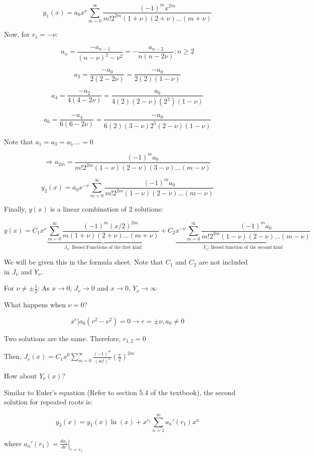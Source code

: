 \documentclass{article}
\begin{document}
$$y_1(x) = a_0 x^{\nu} \sum_{m = 0}^\infty \frac{(-1)^m x^{2m}}{m! 2^{2m} (1 + \nu)(2 + \nu) ... (m + \nu)}$$

Now, for $r_1 = - \nu$:

$$a_n = \frac{-a_{n-1}}{(n - \nu)^2 - \nu^2} = -\frac{a_{n-2}}{n(n - 2 \nu)}; n \geq 2$$

$$a_2 = \frac{-a_0}{2(2-2\nu)} = \frac{-a_0}{2(2)(1-\nu)}$$

$$a_4 = \frac{-a_2}{4(4-2\nu)} = \frac{a_0}{4(2)(2-\nu)(2^2)(1 - \nu)}$$

$$a_6 = \frac{-a_4}{6(6 - 2 \nu)} = \frac{-a_0}{6(2)(3-\nu)2^5 (2 - \nu) (1 - \nu)}$$

Note that $a_1 = a_3 = a_5 .... = 0$

$$\Rightarrow a_{2m} = \frac{(-1)^m a_0}{m! 2^{2m} (1-\nu)(2 - \nu) (3 - \nu) ... (m - \nu)}$$

$$ y_2(x) = a_0 x^{-\nu} \sum_{m = 0}^\infty \frac{(-1)^m a_0}{m! 2^{2m} (1-\nu)(2 - \nu) ... (m - \nu)}$$

Finally, $y(x)$ is a linear combination of 2 solutions:

$$y(x) = C_1 x^{\nu} \underbrace{\sum_{m = 0}^\infty \frac{(-1)^m (x/2)^{2m}}{m (1 + \nu)(2 + \nu) ... (m + \nu)}}_{J_\nu \text{: Bessel Functions of the first kind}} + C_2 \underbrace{x^{-\nu} \sum_{m = 0}^\infty \frac{(-1)^m a_0}{m! 2^{2m} (1-\nu)(2 - \nu) ... (m - \nu)}}_{Y_\nu \text{: Bessel function of the second kind}}$$

We will be given this in the formula sheet. Note that $C_1$ and $C_2$ are not included in $J_\nu$ and $Y_\nu$.

For $\nu \neq \pm \frac{1}{2}$: As $x \to  0$, $J_\nu \to 0$ and $x \to  0$, $Y_\nu \to \infty$

What happens when $\nu = 0$?

$$x^r | a_0 (r^2 - \nu^2) = 0 \rightarrow r = \pm \nu, a_0 \neq 0$$

Two solutions are the same. Therefore, $r_{1,2} = 0$


Then, $J_\nu(x) = C_1 x^0 \sum_{m = 0}^\infty \frac{(-1)^m}{(m!)^2} \left(\frac{x}{2} \right)^{2m}$

How about $Y_\nu (x)$?

Similar to Euler's equation (Refer to section 5.4 of the textbook), the second solution for repeated roots is:

$$y_2 (x) = y_1(x) \ln(x) + x^{r_1} \sum_{n = 1}^\infty a_n ' (r_1) x^n$$
\begin{center}
    where $a_n ' (r_1) = \left. \frac{d a_1}{dr} \right|_{r = r_1}$
\end{center}
\end{document}
